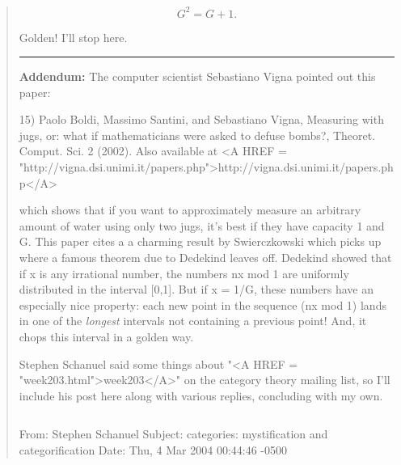 \begin{quote}
$$

G^{2} = G + 1.
$$
    
Golden!  I'll stop here.

\par\noindent\rule{\textwidth}{0.4pt}
\textbf{Addendum:} The computer
scientist Sebastiano Vigna pointed out this paper:

15) Paolo Boldi, Massimo Santini, and Sebastiano Vigna,
Measuring with jugs, or: what if mathematicians were asked
to defuse bombs?, Theoret. Comput. Sci. 2 (2002).
Also available at <A HREF = "http://vigna.dsi.unimi.it/papers.php">http://vigna.dsi.unimi.it/papers.php</A>

which shows that if you want to approximately measure an 
arbitrary amount of water using only two jugs, it's best if
they have capacity 1 and G.   This paper cites a
a charming result by Swierczkowski which picks up where a
famous theorem due to Dedekind leaves off.  
Dedekind showed that if x is any irrational number, the numbers
nx mod 1 are uniformly distributed in the interval [0,1].  But
if x = 1/G, these numbers have an especially nice property:
each new point in the sequence
(nx mod 1) lands in one of the \emph{longest} intervals
not containing a previous point!  And, it chops this
interval in a golden way.  

Stephen Schanuel said some things about "<A HREF = "week203.html">week203</A>" on the category 
theory mailing list, so I'll include his post here along with various
replies, concluding with my own.


$$


From: 	Stephen Schanuel 
Subject: categories: mystification and categorification
Date: 	Thu, 4 Mar 2004 00:44:46 -0500	


\end{quote}
